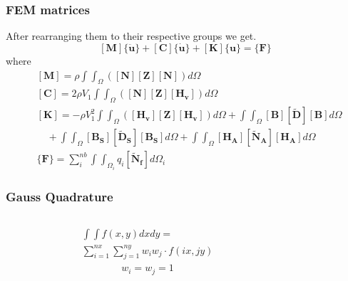 \documentclass[9pt]{beamer}
\begin{document}
\begin{frame}
\frametitle{FEM matrices}
After rearranging them to their respective groups we get.
\begin{equation*}
\left[ \mathbf{M}  \right] 
\{ \ddot{\mathbf{u}} \}
+
\left[ \mathbf{C}  \right] 
\{ \dot{\mathbf{u}} \}
+
\left[ \mathbf{K}  \right] 
\{\mathbf{u} \}
=
\{ \mathbf{F} \}
\end{equation*}
where 
\begin{align*}
&\left[ \mathbf{M}  \right]  
= \rho
\int \int_\Omega 
\left(
\left[ \mathbf{N}  \right]
\left[ \mathbf{Z}  \right]
\left[ \mathbf{N}  \right] 
\right)  d \Omega  \\
&\left[ \mathbf{C}  \right]   
= 2 \rho V_1
\int \int_\Omega 
\left( 
\left[ \mathbf{N}  \right]
\left[ \mathbf{Z}  \right]
\left[ \mathbf{H_v}  \right] 
\right)  d \Omega  \\ &
\left[ \mathbf{K}  \right] 
=  - \rho V_1^2
\int \int_\Omega 
\left( 
\left[ \mathbf{H_v}  \right]
\left[ \mathbf{Z}  \right]
\left[ \mathbf{H_v}  \right] 
\right)  d \Omega + 
\int \int_\Omega  
\left[ \mathbf{B}  \right]
\left[ \mathbf{\tilde{D}}  \right]
\left[ \mathbf{B}  \right]  
  d \Omega   \\  &  \quad +
  \int \int_\Omega  
\left[ \mathbf{B_S}  \right]
\left[ \mathbf{\tilde{D}_S}  \right]
\left[ \mathbf{B_S}  \right] 
  d \Omega +
  \int \int_\Omega  
\left[ \mathbf{H_A}  \right]
\left[ \mathbf{\tilde{N}_A}  \right]
\left[ \mathbf{H_A}  \right]  
  d \Omega  \\ &
\{ \mathbf{F} \}  = 
 \sum_i^{nb}   \int  \int_{\Omega_i}   
 q_i 
\left[ \mathbf{\tilde{N}_f}  \right] 
  d \Omega_i    
\end{align*}
\end{frame}


\begin{frame}
\frametitle{Gauss Quadrature}

\begin{columns}
\begin{figure}[h!]
\centering

\end{figure}
\begin{equation*}
\begin{split}
\int \int f(x,y) dx dy = \\
 \sum_{i = 1}^{nx} \sum_{j = 1}^{ny} w_i  w_j \cdot f(ix,jy) 
\end{split}
\end{equation*}
\begin{equation*}
\begin{split}
w_i = w_j =1
\end{split}
\end{equation*}
\end{columns}
\end{frame}
\end{document}
